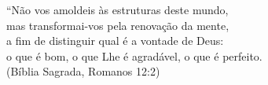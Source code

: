 \begin{epigrafe}
  \vspace*{\fill}
	\begin{flushright}
		``Não vos amoldeis às estruturas deste mundo, \\
		mas transformai-vos pela renovação da mente, \\
		a fim de distinguir qual é a vontade de Deus: \\
		o que é bom, o que Lhe é agradável, o que é perfeito.\\
		(Bíblia Sagrada, Romanos 12:2)
	\end{flushright}
\end{epigrafe}
